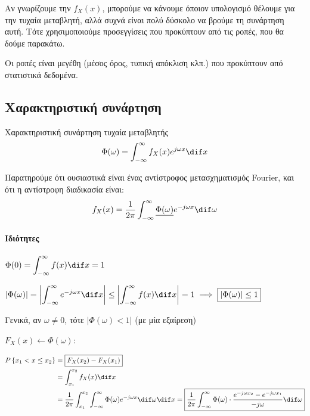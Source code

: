 \documentclass[11pt,a4paper,notitlepage,fleqn,final]{article}
\begin{document}
Αν γνωρίζουμε την \( f_X(x) \), μπορούμε να κάνουμε όποιον
υπολογισμό θέλουμε για την τυχαία μεταβλητή, αλλά συχνά είναι
πολύ δύσκολο να βρούμε τη συνάρτηση αυτή. Τότε χρησιμοποιούμε
προσεγγίσεις που προκύπτουν από τις ροπές, που θα δούμε παρακάτω.

Οι ροπές είναι μεγέθη (μέσος όρος, τυπική απόκλιση κλπ.) που
προκύπτουν από στατιστικά δεδομένα.

\subsection{Χαρακτηριστική συνάρτηση}
\begin{defn}{Χαρακτηριστική συνάρτηση τυχαία μεταβλητής}{}
	\[
	\Phi(\omega ) = \int_{-\infty}^{\infty} f_X(x) e^{j\omega x}
	\dif x
	\]
\end{defn}
Παρατηρούμε ότι ουσιαστικά είναι ένας αντίστροφος μετασχηματισμός
Fourier, και ότι η αντίστροφη διαδικασία είναι:
\[
f_X(x) = \frac{1}{2\pi} \int_{-\infty}^{\infty}
\underline{\Phi(\omega )} e^{-j\omega x}\dif \omega
\]

\paragraph{Ιδιότητες}
\begin{enumpar}
	\item \( \displaystyle \Phi(0)
	= \int_{-\infty}^{\infty} f(x)\dif x = 1 \)
	\item \( \displaystyle \left| \Phi(\omega ) \right| = \left|
	\int_{-\infty}^{\infty} e^{-j\omega x}\dif x
	\right|
	\leq \left|\int_{-\infty}^{\infty} f(x)\dif x\right| = 1
	\implies \boxed{\left|\Phi(\omega )\right|\leq1}
	\)

	Γενικά, αν \( \omega \neq 0 \), τότε \( \left|
	\Phi(\omega ) < 1
	\right| \) (με μία εξαίρεση)
	\item \( F_X(x) \leftarrow \Phi(\omega ) \):

	\begin{align*}
		P\left\lbrace x_1 < x \leq x_2 \right\rbrace
		&= \boxed{F_X(x_2) - F_X(x_1)}
		\\ &= \int_{x_1}^{x_2} f_X(x)\dif x
		\\ &= \frac{1}{2\pi} \int_{x_1}^{x_2}
		\int_{-\infty}^{\infty} \Phi(\omega )e^{-j\omega x}
		\dif \omega \dif x = \boxed{
			\frac{1}{2\pi} \int_{-\infty}^{\infty}
			\Phi(\omega) \cdot
			\frac{e^{-j\omega x_2}-e^{-j\omega x_1}}{-j\omega }
			\dif \omega
			}
	\end{align*}
\end{enumpar}
\end{document}
